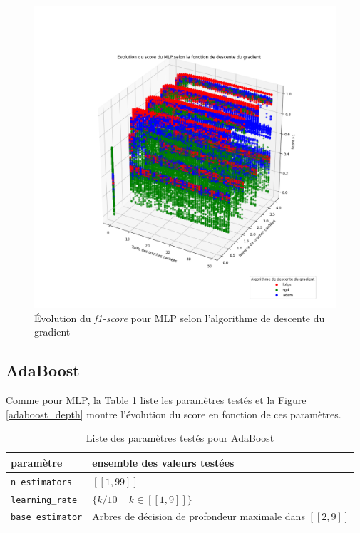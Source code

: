 \documentclass[a4paper]{report}
\begin{document}
\begin{figure}
\centering
\includegraphics[width=\textwidth]{img/mlp_solver.png}
\caption{Évolution du \emph{f1-score} pour MLP selon l'algorithme de descente du gradient\label{mlp_solver}}
\end{figure}

\subsection{AdaBoost}

Comme pour MLP, la Table \ref{params_ada} liste les paramètres testés et la Figure \ref{adaboost_depth} montre l'évolution du score en fonction de ces paramètres.

\begin{table}[h]
\centering
\begin{tabular}{ll}
paramètre & ensemble des valeurs testées \\
\hline
\texttt{n\_estimators} & $[\![1, 99]\!]$ \\
\texttt{learning\_rate} & $\{k/10 \>\> | \>\> k \in [\![1, 9]\!] \}$ \\
\texttt{base\_estimator} & Arbres de décision de profondeur maximale dans $[\![2, 9]\!]$\\
\end{tabular}
\caption{Liste des paramètres testés pour AdaBoost\label{params_ada}}
\end{table}
\end{document}
